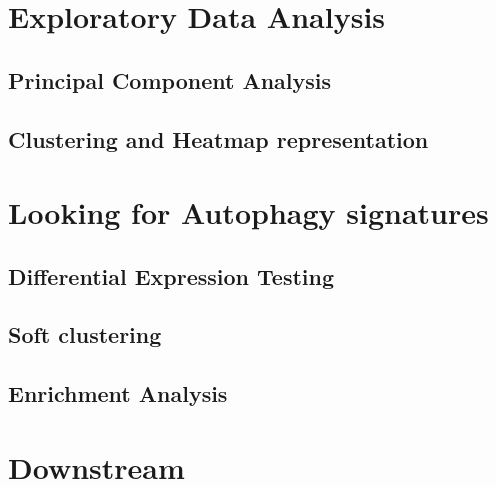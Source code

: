     
\section{Exploratory Data Analysis}

    \subsection{Principal Component Analysis}

    \subsection{Clustering and Heatmap representation}

\section{Looking for Autophagy signatures}

    \subsection{Differential Expression Testing}

    \subsection{Soft clustering}
    
    \subsection{Enrichment Analysis}
    
\section{Downstream}
